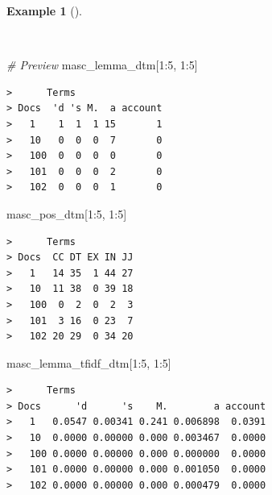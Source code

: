 \documentclass[
  letterpaper,
  DIV=11,
  numbers=noendperiod]{scrreport}
\newenvironment{Shaded}{\begin{snugshade}}{\end{snugshade}}
\newcommand{\CommentTok}[1]{\textcolor[rgb]{0.00,0.00,0.00}{\textit{#1}}}
\newcommand{\DecValTok}[1]{\textcolor[rgb]{0.00,0.00,0.00}{#1}}
\newcommand{\NormalTok}[1]{\textcolor[rgb]{0.00,0.00,0.00}{#1}}
\newcommand{\SpecialCharTok}[1]{\textcolor[rgb]{0.00,0.00,0.00}{#1}}
\theoremstyle{definition}
\newtheorem{example}{Example}[chapter]
\theoremstyle{remark}
\begin{document}
\begin{example}[]\protect\hypertarget{exm-eda-masc-dtms-preview}{}\label{exm-eda-masc-dtms-preview}

~

\begin{Shaded}
\begin{Highlighting}[]
\CommentTok{\# Preview}
\NormalTok{masc\_lemma\_dtm[}\DecValTok{1}\SpecialCharTok{:}\DecValTok{5}\NormalTok{, }\DecValTok{1}\SpecialCharTok{:}\DecValTok{5}\NormalTok{]}
\end{Highlighting}
\end{Shaded}

\begin{verbatim}
>      Terms
> Docs  'd 's M.  a account
>   1    1  1  1 15       1
>   10   0  0  0  7       0
>   100  0  0  0  0       0
>   101  0  0  0  2       0
>   102  0  0  0  1       0
\end{verbatim}

\begin{Shaded}
\begin{Highlighting}[]
\NormalTok{masc\_pos\_dtm[}\DecValTok{1}\SpecialCharTok{:}\DecValTok{5}\NormalTok{, }\DecValTok{1}\SpecialCharTok{:}\DecValTok{5}\NormalTok{]}
\end{Highlighting}
\end{Shaded}

\begin{verbatim}
>      Terms
> Docs  CC DT EX IN JJ
>   1   14 35  1 44 27
>   10  11 38  0 39 18
>   100  0  2  0  2  3
>   101  3 16  0 23  7
>   102 20 29  0 34 20
\end{verbatim}

\begin{Shaded}
\begin{Highlighting}[]
\NormalTok{masc\_lemma\_tfidf\_dtm[}\DecValTok{1}\SpecialCharTok{:}\DecValTok{5}\NormalTok{, }\DecValTok{1}\SpecialCharTok{:}\DecValTok{5}\NormalTok{]}
\end{Highlighting}
\end{Shaded}

\begin{verbatim}
>      Terms
> Docs      'd      's    M.        a account
>   1   0.0547 0.00341 0.241 0.006898  0.0391
>   10  0.0000 0.00000 0.000 0.003467  0.0000
>   100 0.0000 0.00000 0.000 0.000000  0.0000
>   101 0.0000 0.00000 0.000 0.001050  0.0000
>   102 0.0000 0.00000 0.000 0.000479  0.0000
\end{verbatim}

\end{example}
\end{document}
